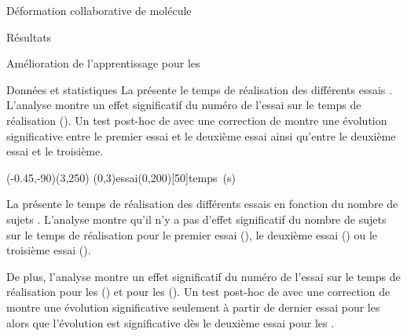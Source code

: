 \documentclass[myfrancais,ngerman,english,frenchb]{mythesis}
\begin{document}
\begin{mychapter}{Déformation collaborative de molécule}
\begin{mysection}{Résultats}
\begin{mysubsection}{Amélioration de l'apprentissage pour les }
\begin{mysubsubsection}{Données et statistiques}
					La  présente le temps de réalisation  des différents essais .
					L'analyse montre un effet significatif du numéro de l'essai  sur le temps de réalisation  ().
					Un test post-hoc de  avec une correction de  montre une évolution significative entre le premier essai et le deuxième essai ainsi qu'entre le deuxième essai et le troisième.

					\begin{myfigure}
						\begin{myps}(-0.45,-90)(3,250)
							\myaxes(0,3){essai}(0,200)[50]{temps~(s)}
						\end{myps}
					\end{myfigure}

					La  présente le temps de réalisation  des différents essais  en fonction du nombre de sujets .
					L'analyse montre qu'il n'y a pas d'effet significatif du nombre de sujets  sur le temps de réalisation  pour le premier essai (), le deuxième essai () ou le troisième essai ().

					De plus, l'analyse montre un effet significatif du numéro de l'essai  sur le temps de réalisation  pour les  () et pour les  ().
					Un test post-hoc de  avec une correction de  montre une évolution significative seulement à partir de dernier essai pour les  alors que l'évolution est significative dès le deuxième essai pour les .


\end{mysubsubsection}
\end{mysubsection}
\end{mysection}
\end{mychapter}
\end{document}
